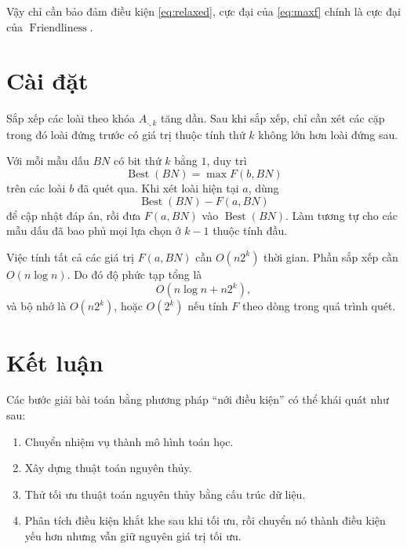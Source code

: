 \documentclass[11pt]{article}
\begin{document}
Vậy chỉ cần bảo đảm điều kiện \eqref{eq:relaxed}, cực đại của \eqref{eq:maxf} chính là cực đại của
\(\operatorname{Friendliness}\).

\section{Cài đặt}

Sắp xếp các loài theo khóa \(A_{\cdot,k}\) tăng dần. Sau khi sắp xếp, chỉ cần
xét các cặp trong đó loài đứng trước có giá trị thuộc tính thứ \(k\) không lớn
hơn loài đứng sau.

Với mỗi mẫu dấu \(BN\) có bit thứ \(k\) bằng \(1\), duy trì
\[
  \operatorname{Best}(BN)=\max F(b,BN)
\]
trên các loài \(b\) đã quét qua. Khi xét loài hiện tại \(a\), dùng
\[
  \operatorname{Best}(BN)-F(a,BN)
\]
để cập nhật đáp án, rồi đưa \(F(a,BN)\) vào \(\operatorname{Best}(BN)\).
Làm tương tự cho các mẫu dấu đã bao phủ mọi lựa chọn ở \(k-1\) thuộc tính đầu.

Việc tính tất cả các giá trị \(F(a,BN)\) cần \(O(n2^k)\) thời gian. Phần sắp
xếp cần \(O(n\log n)\). Do đó độ phức tạp tổng là
\[
  O(n\log n+n2^k),
\]
và bộ nhớ là \(O(n2^k)\), hoặc \(O(2^k)\) nếu tính \(F\) theo dòng trong quá
trình quét.

\section{Kết luận}

Các bước giải bài toán bằng phương pháp ``nới điều kiện'' có thể khái quát như
sau:

\begin{enumerate}
  \item Chuyển nhiệm vụ thành mô hình toán học.
  \item Xây dựng thuật toán nguyên thủy.
  \item Thử tối ưu thuật toán nguyên thủy bằng cấu trúc dữ liệu.
  \item Phân tích điều kiện khắt khe sau khi tối ưu, rồi chuyển nó thành điều
  kiện yếu hơn nhưng vẫn giữ nguyên giá trị tối ưu.
\end{enumerate}
\end{document}
